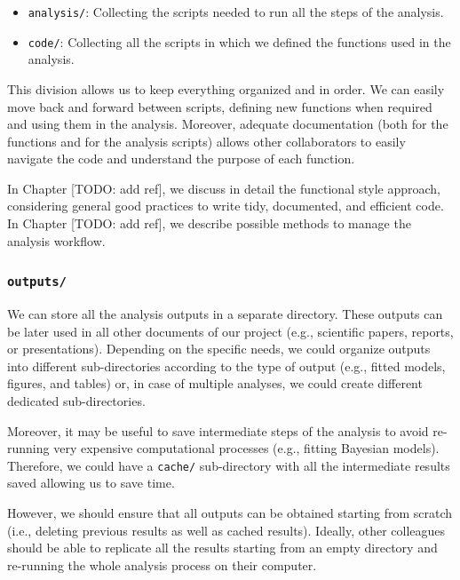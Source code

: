 \documentclass[
  11pt,
]{book}
\providecommand{\tightlist}{%
  \setlength{\itemsep}{0pt}\setlength{\parskip}{0pt}}
\begin{document}
\begin{itemize}
\tightlist
\item
  \texttt{analysis/}: Collecting the scripts needed to run all the steps of the analysis.
\item
  \texttt{code/}: Collecting all the scripts in which we defined the functions used in the analysis.
\end{itemize}

This division allows us to keep everything organized and in order. We can easily move back and forward between scripts, defining new functions when required and using them in the analysis. Moreover, adequate documentation (both for the functions and for the analysis scripts) allows other collaborators to easily navigate the code and understand the purpose of each function.

In Chapter {[}TODO: add ref{]}, we discuss in detail the functional style approach, considering general good practices to write tidy, documented, and efficient code. In Chapter {[}TODO: add ref{]}, we describe possible methods to manage the analysis workflow.

\hypertarget{outputs}{%
\subsubsection{\texorpdfstring{\texttt{outputs/}}{outputs/}}\label{outputs}}

We can store all the analysis outputs in a separate directory. These outputs can be later used in all other documents of our project (e.g., scientific papers, reports, or presentations). Depending on the specific needs, we could organize outputs into different sub-directories according to the type of output (e.g., fitted models, figures, and tables) or, in case of multiple analyses, we could create different dedicated sub-directories.

Moreover, it may be useful to save intermediate steps of the analysis to avoid re-running very expensive computational processes (e.g., fitting Bayesian models). Therefore, we could have a \texttt{cache/} sub-directory with all the intermediate results saved allowing us to save time.

However, we should ensure that all outputs can be obtained starting from scratch (i.e., deleting previous results as well as cached results). Ideally, other colleagues should be able to replicate all the results starting from an empty directory and re-running the whole analysis process on their computer.
\end{document}
